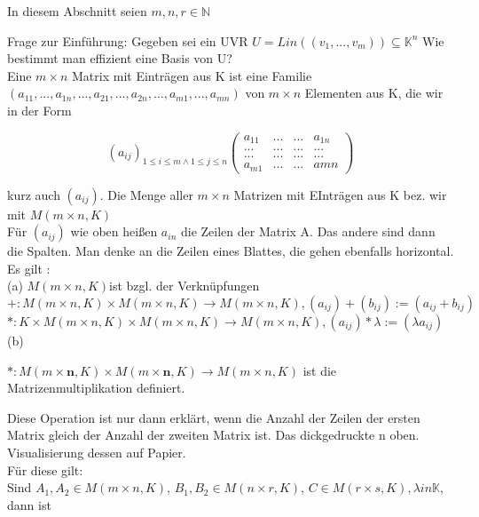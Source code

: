 \documentclass[headsepline,12pt,a4paper]{scrartcl}
\makeatletter
\def\myItem{%
   \@ifnextchar[ \@myItem{\@noitemargtrue\@myItem[\@itemlabel]}}
\def\@myItem[#1]{\item[#1]\mbox{}\\}
\makeatother
\begin{document}
In diesem Abschnitt seien $m,n,r \in \mathbb{N}$

Frage zur Einführung: Gegeben sei ein UVR $U= Lin((v_1,...,v_m)) \subseteq \mathbb{K}^n$ Wie bestimmt man effizient eine Basis von U? \\

\myItem[Def. 10.1 Matrix]
Eine $m \times n$ Matrix mit Einträgen aus K ist eine Familie 
$(a_{11},...,a_{1n},...,a_{21},...,a_{2n},...,a_{m1},...,a_{mn})$ von $m \times n$ Elementen aus K, die wir in der Form 


$$ (a_{ij})_{1 \leq i \leq m \wedge 1 \leq j \leq n}
\begin{pmatrix}
a_{11} & ... & ... & a_{1n} \\
... & ... & ... & ... \\
... & ... & ... & ... \\
a_{m1} & ... & ... & a{mn}
\end{pmatrix}
$$ 

kurz auch $(a_{ij})$. Die Menge aller $m\times n$ Matrizen mit EInträgen aus K bez. wir mit 
$M(m\times n, K)$ \\

Für $(a_{ij})$ wie oben heißen $a_{in}$ die Zeilen der Matrix A. Das andere sind dann die Spalten. Man denke an die Zeilen eines Blattes, die gehen ebenfalls horizontal. \\

\myItem[Bem 10.2] 
Es gilt : \\
(a) $M(m \times n, K) $ist bzgl. der Verknüpfungen  \\
$+: M(m \times n, K) \times M(m \times n, K) \rightarrow M(m \times n, K), (a_{ij}) + (b_{ij}):= (a_{ij}+b_{ij})$\\

$*: K\times M(m \times n, K) \times M(m \times n, K) \rightarrow M(m \times n, K), (a_{ij}) * \lambda := (\lambda a_{ij})$ \\

(b) 

$ * : M(m \times \textbf{n}, K) \times M(m \times \textbf{n}, K) \rightarrow M(m \times n, K)$ ist die Matrizenmultiplikation definiert.

Diese Operation ist nur dann erklärt, wenn die Anzahl der Zeilen der ersten Matrix gleich der Anzahl der zweiten Matrix ist. Das dickgedruckte n oben. \\

Visualisierung dessen auf Papier. \\

Für diese gilt: \\
Sind $A_1,A_2 \in M(m\times n, K)$, $B_1,B_2 \in M(n\times r, K)$, $C \in M(r\times s, K), \lambda in \mathbb{K}$, dann ist \\
\end{document}
